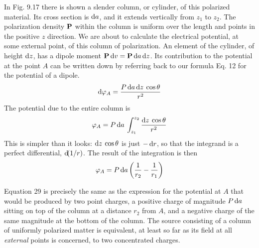 In Fig. 9.17 there is shown a slender column, or cylinder, of this
polarized material. Its cross section is $\operatorname{d\!} a$, and it extends vertically
from $z_1$ to $z_2$. The polarization density $\mathbf{P}$ within the column is uniform
over the length and points in the positive $z$ direction. We are
about to calculate the electrical potential, at some external point, of
this column of polarization. An element of the cylinder, of height $\operatorname{d\!} z$,
has a dipole moment $\mathbf{P} \operatorname{d\!} v = \mathbf{P} \operatorname{d\!} a \operatorname{d\!} z$. Its contribution to the potential
at the point $A$ can be written down by referring back to our
formula Eq. 12 for the potential of a dipole.
\begin{equation}
  \operatorname{d\!}\varphi_A = \frac{P\operatorname{d\!} a\operatorname{d\!} z\:\cos\theta}{r^2}
\end{equation}
The potential due to the entire column is
\begin{equation}
  \varphi_A = P\operatorname{d\!} a\:\int_{z_1}^{z_2} \frac{\operatorname{d\!} z\:\cos\theta}{r^2}
\end{equation}
This is simpler than it looks: $\operatorname{d\!} z\:\cos\theta$ is just $-\operatorname{d\!} r$, so that the 
integrand is a perfect differential, $\operatorname{d\!}(1 /r)$. The result of the integration is
then
\begin{equation}
  \varphi_A = P\operatorname{d\!} a\left(\frac{1}{r_2}-\frac{1}{r_1}\right)
\end{equation}

Equation 29 is precisely the same as the expression for the potential
at $A$ that would be produced by two point charges, a positive
charge of magnitude $P\operatorname{d\!} a$ sitting on top of the column at a distance $r_2$
from $A$, and a negative charge of the same magnitude at the bottom
of the column. The source consisting of a column of uniformly
polarized matter is equivalent, at least so far as its field at all \emph{external}
points is concerned, to two concentrated charges.


